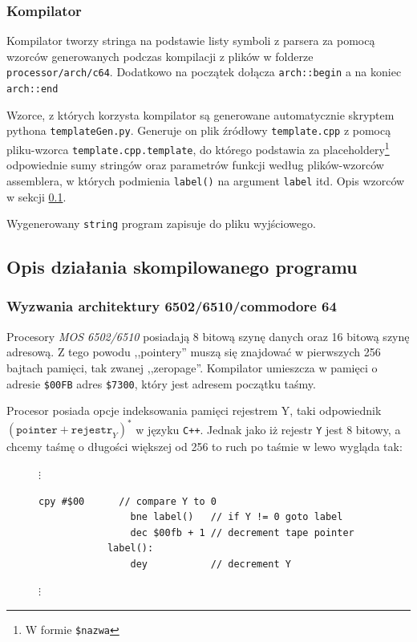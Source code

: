 \documentclass[a4paper,12pt]{article}
\begin{document}
    \subsubsection*{Kompilator}

    Kompilator tworzy stringa na podstawie listy symboli z parsera za pomocą wzorców generowanych podczas kompilacji z plików w folderze \texttt{processor/arch/c64}. Dodatkowo na początek dołącza \texttt{arch::begin} a na koniec \texttt{arch::end}

    Wzorce, z których korzysta kompilator są generowane automatycznie skryptem pythona \texttt{templateGen.py}. Generuje on plik źródłowy \texttt{template.cpp} z pomocą pliku-wzorca \texttt{template.cpp.template}, do którego podstawia za placeholdery\footnote{W formie \texttt{\$nazwa}} odpowiednie sumy stringów oraz parametrów funkcji według plików-wzorców assemblera, w których podmienia \texttt{label()} na argument \texttt{label} itd. Opis wzorców w sekcji \ref{wzorce}.


    Wygenerowany \texttt{string} program zapisuje do pliku wyjściowego.

    \subsection{Opis działania skompilowanego programu}\label{wzorce}
    
    \subsubsection*{Wyzwania architektury 6502/6510/commodore 64}

    Procesory \emph{MOS 6502/6510} posiadają 8 bitową szynę danych oraz 16 bitową szynę adresową. Z tego powodu ,,pointery'' muszą się znajdować w pierwszych 256 bajtach pamięci, tak zwanej ,,zeropage''. Kompilator umieszcza w pamięci o adresie \texttt{\$00FB} adres \texttt{\$7300}, który jest adresem początku taśmy. 

    Procesor posiada opcje indeksowania pamięci rejestrem Y, taki odpowiednik $\left(\texttt{pointer} + \texttt{rejestr}_Y \right)^*$ w języku \texttt{C++}. Jednak jako iż rejestr \texttt{Y} jest 8 bitowy, a chcemy taśmę o długości większej od 256 to ruch po taśmie w lewo wygląda tak:

    \begin{figure}[H]
        $\vdots$
    \centering
        \vspace{-3mm}
        \begin{lstlisting}[basicstyle=\ttfamily,morekeywords={cpy,bne,dec,dey}]
                cpy #$00      // compare Y to 0
                bne label()   // if Y != 0 goto label
                dec $00fb + 1 // decrement tape pointer
            label():
                dey           // decrement Y
        \end{lstlisting}
        \vspace{-3mm}
        \centering
        $\vdots$
    \centering
    \end{figure}
\end{document}
